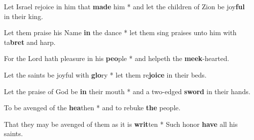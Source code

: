 \begin{multicols}{2}
	Let Israel rejoice in him that \textbf{made} him * and let the children of Zion be joy\textbf{ful} in their king.
	
	Let them praise his Name \textbf{in} the dance * let them sing praises unto him with ta\textbf{bret} and harp.
	
	For the Lord hath pleasure in his \textbf{peo}ple * and helpeth the \textbf{meek}-hearted.
	
	Let the saints be joyful with \textbf{glo}ry * let them re\textbf{joice} in their beds.
	
	Let the praise of God be \textbf{in} their mouth * and a two-edged \textbf{sword} in their hands.
	
	To be avenged of the \textbf{hea}then * and to rebuke \textbf{the} people.
	
	That they may be avenged of them as it is \textbf{writ}ten * Such honor \textbf{have} all his saints.
\end{multicols}